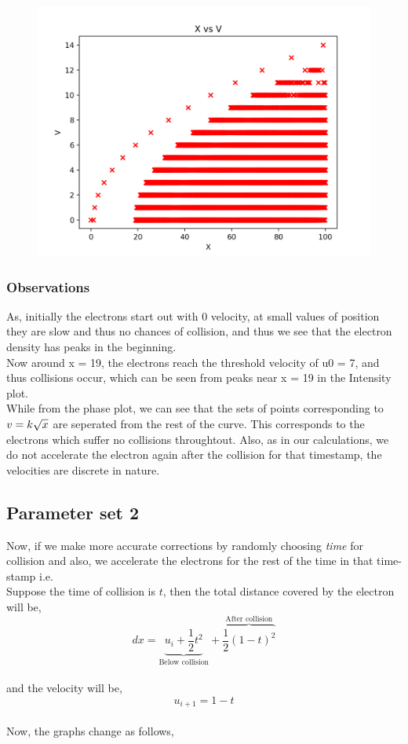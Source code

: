 \documentclass[11pt, a4paper]{article}
\begin{document}
\begin{figure}[!tbh]
    \centering
    \includegraphics[scale = 0.7]{default_3.png}
\end{figure}

\newpage
\subsubsection{Observations}
  As, initially the electrons start out with 0 velocity, at small values of position they are slow and thus no chances of collision, and thus we see that the electron density has peaks in the beginning.\\

  Now around x = 19, the electrons reach the threshold velocity of u0 = 7, and thus collisions occur, which can be seen from peaks near x = 19 in the Intensity plot.\\

  While from the phase plot, we can see that the sets of points corresponding to \(v \space = k \sqrt{x}\) are seperated from the rest of the curve. This corresponds to the electrons which suffer no collisions throughtout. Also, as in our calculations, we do not accelerate the electron again after the collision for that timestamp, the velocities are discrete in nature.\\

\subsection{Parameter set 2}
Now, if we make more accurate corrections by randomly choosing \emph{time} for collision and also, we accelerate the electrons for the rest of the time in that time-stamp i.e.\\
Suppose the time of collision is $t$, then the total distance covered by the electron will be, 
\[
dx = \underbrace{u_i + \frac{1}{2}t^2}_\text{Below collision} + \overbrace{\frac{1}{2}(1-t)^2}^\text{After collision}
\]\\
and the velocity will be,
\[
u_{i+1} = 1 - t
\]\\
Now, the graphs change as follows,
\end{document}
